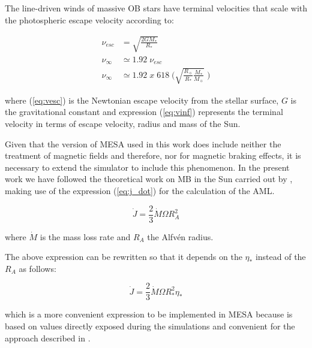 \documentclass[fleqn,usenatbib]{mnras}
\begin{document}
The line-driven winds of massive OB stars have terminal velocities that scale with the photospheric escape velocity \citep{Lamers2000} according to:
\begin{ceqn}
\begin{align}
\nu_{esc} &= \sqrt{\frac{2GM_*}{R_*}} \label{eq:vesc} \\
\nu_\infty &\simeq 1.92 \;\nu_{esc}\\
\nu_\infty &\simeq 1.92 \; x \; 618 \; \Bigg(\sqrt{\frac{R_{\sun}}{R_*}\frac{M_*}{M_{\sun}}} \;\Bigg) \label{eq:vinf}
\end{align}
\end{ceqn}
where (\ref{eq:vesc}) is the Newtonian escape velocity from the stellar surface, $G$ is the gravitational constant and expression (\ref{eq:vinf}) represents the terminal velocity in terms of escape velocity, radius and mass of the Sun.\par

Given that the version of MESA used in this work does include neither the treatment of magnetic fields and therefore, nor for magnetic braking effects, it is necessary to extend the simulator to include this phenomenon. In the present work we have followed the theoretical work on MB in the Sun carried out by \citet{Weber1967}, making use of the expression (\ref{eq:j_dot}) for the calculation of the AML.
\begin{ceqn}
\begin{equation}
 \Dot{J} = \frac{2}{3} \Dot{M}\Omega R^{2}_{A} \label{eq:j_dot}
\end{equation}
\end{ceqn}
where $\Dot{M}$ is the mass loss rate and $R_A$ the Alfv\'{e}n radius. \par

The above expression can be rewritten so that it depends on the $\eta_*$ instead of the $R_A$ as follows:
\begin{ceqn}
\begin{equation}
 \Dot{J} = \frac{2}{3} \Dot{M}\Omega R^{2}_{*}\eta_* \label{eq:j_dot_mesa}
\end{equation}
\end{ceqn}
which is a more convenient expression to be implemented in MESA because is based on values directly exposed during the simulations and convenient for the approach described in \citet{Ud-Doula2007}.
\end{document}
